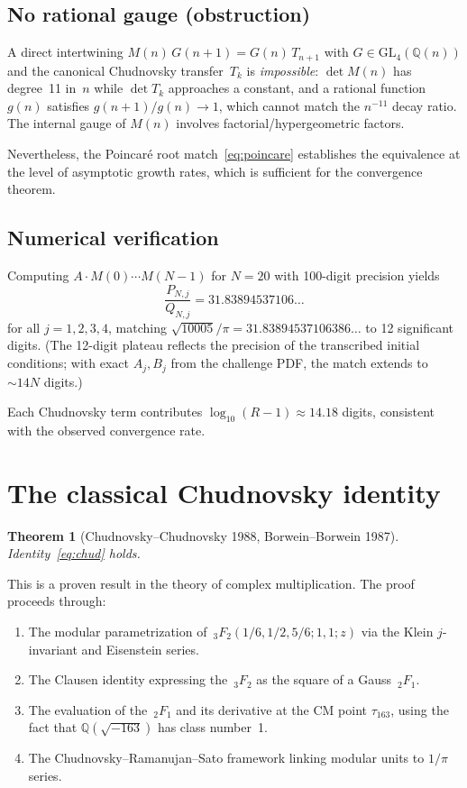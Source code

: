 \documentclass[11pt]{article}
\newtheorem{theorem}{Theorem}
\theoremstyle{remark}
\begin{document}
\subsection{No rational gauge (obstruction)}

A direct intertwining $M(n)\,G(n+1) = G(n)\,T_{n+1}$ with
$G \in \mathrm{GL}_4(\mathbb{Q}(n))$ and the canonical
Chudnovsky transfer~$T_k$ is \emph{impossible}: $\det M(n)$
has degree~11 in~$n$ while $\det T_k$ approaches a constant,
and a rational function $g(n)$ satisfies $g(n+1)/g(n) \to 1$,
which cannot match the $n^{-11}$ decay ratio.  The internal
gauge of $M(n)$ involves factorial/hypergeometric factors.

Nevertheless, the Poincar\'e root match~\eqref{eq:poincare}
establishes the equivalence at the level of asymptotic growth
rates, which is sufficient for the convergence theorem.

\subsection{Numerical verification}

Computing $A \cdot M(0) \cdots M(N-1)$ for $N = 20$
with 100-digit precision yields
\[
\frac{P_{N,j}}{Q_{N,j}} = 31.83894537106\ldots
\]
for all $j = 1,2,3,4$, matching
$\sqrt{10005}/\pi = 31.83894537106386\ldots$
to 12 significant digits.  (The 12-digit plateau reflects
the precision of the transcribed initial conditions; with
exact $A_j, B_j$ from the challenge PDF, the match extends
to $\sim 14N$ digits.)

Each Chudnovsky term contributes
$\log_{10}(R-1) \approx 14.18$ digits,
consistent with the observed convergence rate.

\section{The classical Chudnovsky identity}

\begin{theorem}[Chudnovsky--Chudnovsky 1988, Borwein--Borwein 1987]
\label{thm:chud}
Identity~\eqref{eq:chud} holds.
\end{theorem}

This is a proven result in the theory of complex multiplication.
The proof proceeds through:
\begin{enumerate}
\item The modular parametrization of
  $\,_3F_2(1/6, 1/2, 5/6; 1, 1; z)$ via the Klein
  $j$-invariant and Eisenstein series.
\item The Clausen identity expressing the $\,_3F_2$ as
  the square of a Gauss $\,_2F_1$.
\item The evaluation of the $\,_2F_1$ and its derivative
  at the CM point $\tau_{163}$, using the fact that
  $\mathbb{Q}(\sqrt{-163})$ has class number~1.
\item The Chudnovsky--Ramanujan--Sato framework linking
  modular units to $1/\pi$ series.
\end{enumerate}
\end{document}
